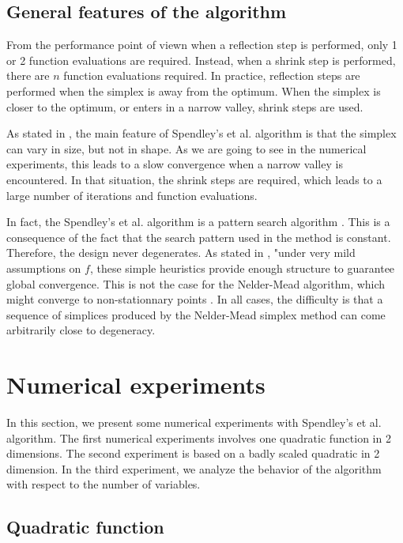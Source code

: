 \subsection{General features of the algorithm}

From the performance point of viewn when a reflection step is performed,
only 1 or 2 function evaluations are required. Instead, when a shrink
step is performed, there are $n$ function evaluations required. In practice,
reflection steps are performed when the simplex is away from the optimum.
When the simplex is closer to the optimum, or enters in a narrow valley, shrink
steps are used.

As stated in \cite{Singer:2009}, the main feature 
of Spendley's et al. algorithm is that the simplex can vary 
in size, but not in shape. As we are going to see in the numerical 
experiments, this leads to a slow convergence when a narrow 
valley is encountered. In that situation, the shrink
steps are required, which leads to a large number 
of iterations and function evaluations.

In fact, the Spendley's et al. algorithm is a pattern search 
algorithm \cite{Torczon98fromevolutionary}. This is a consequence 
of the fact that the search pattern used in the method is constant.
Therefore, the design never degenerates. 
As stated in \cite{Torczon98fromevolutionary}, "under very mild 
assumptions on $f$, these simple heuristics 
provide enough structure to guarantee global convergence.
This is not the case for the Nelder-Mead algorithm, which might
converge to non-stationnary points \cite{589109, hanNeumann2003, Han2000, Torczon89multi-directionalsearch}. 
In all cases, the difficulty is that a sequence of simplices produced
by the Nelder-Mead simplex method can come arbitrarily close to 
degeneracy.

\section{Numerical experiments}

In this section, we present some numerical experiments 
with Spendley's et al. algorithm.
The first numerical experiments involves one quadratic function
in 2 dimensions. The second experiment is based on a 
badly scaled quadratic in 2 dimension. In the third experiment,
we analyze the behavior of the algorithm with respect to the 
number of variables.

\subsection{Quadratic function}

